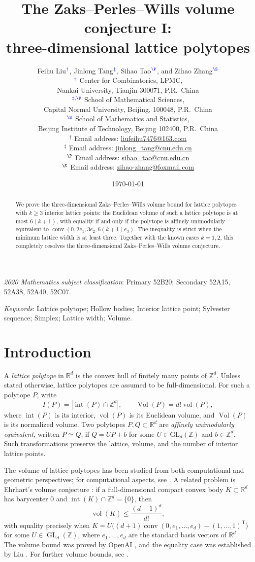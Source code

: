 \documentclass[reqno, 11pt]{article}
\title{The Zaks--Perles--Wills volume conjecture I:\\ three-dimensional lattice polytopes}
\author{Feihu Liu$^{\color{blue} \dag}$, Jinlong Tang$^{\color{blue} \ddag}$, Sihao Tao$^{\color{blue} \P}$, and Zihao Zhang$^{\color{blue} \S}$
\\[2mm]
{\small $^{\color{blue} \dag}$ Center for Combinatorics, LPMC,}\\[-0.8ex]
{\small Nankai University, Tianjin 300071, P.R.~China}\\
{\small $^{\color{blue} \ddag, \P}$ School of Mathematical Sciences,}\\[-0.8ex]
{\small Capital Normal University, Beijing, 100048, P.R.~China}\\
{\small $^{\color{blue} \S}$ School of Mathematics and Statistics,}\\[-0.8ex]
{\small Beijing Institute of Technology, Beijing 102400, P.R.~China}\\
{\small {\color{blue} $^\dag$} Email address: \url{liufeihu7476@163.com}}\\
{\small {\color{blue} $^\ddag$} Email address: \url{jinlong\_tang@cnu.edu.cn}}\\
{\small {\color{blue} $^\P$} Email address: \url{sihao\_tao@cnu.edu.cn}}\\
{\small {\color{blue} $^\S$} Email address: \url{zihao-zhang@foxmail.com}}\\
}
\date{\today}
\numberwithin{equation}{section}
\theoremstyle{definition}
\newcommand{\R}{\mathbb R}
\newcommand{\Z}{\mathbb Z}
\DeclareMathOperator{\Int}{int}
\DeclareMathOperator{\vol}{vol}
\DeclareMathOperator{\conv}{conv}
\numberwithin{equation}{section}
\begin{document}
\maketitle

\begin{abstract}
We prove the three-dimensional Zaks--Perles--Wills volume bound for lattice polytopes with $k\ge3$ interior lattice points: the Euclidean volume of such a lattice polytope is at most $6(k+1)$, with equality if and only if the polytope is affinely unimodularly equivalent to $\operatorname{conv}(0,2e_1,3e_2,6(k+1)e_3)$. The inequality is strict when the minimum lattice width is at least three. Together with the known cases $k=1,2$, this completely resolves the three-dimensional Zaks--Perles--Wills volume conjecture.
\end{abstract}

\noindent
\begin{small}
\emph{2020 Mathematics subject classification}: Primary 52B20; Secondary 52A15, 52A38, 52A40, 52C07.
\end{small}

\noindent
\begin{small}
\emph{Keywords}: Lattice polytope; Hollow bodies; Interior lattice point; Sylvester sequence; Simplex; Lattice width; Volume.
\end{small}


\section{Introduction}\label{sec:introduction}

A \emph{lattice polytope} in $\R^d$ is the convex hull of finitely many points of $\Z^d$.
Unless stated otherwise, lattice polytopes are assumed to be full-dimensional.
For such a polytope $P$, write
\[
I(P)=|\Int(P)\cap\Z^d|,\qquad
\operatorname{Vol}(P)=d!\vol(P),
\]
where $\Int(P)$ is its interior, $\vol(P)$ is its Euclidean volume, and
$\operatorname{Vol}(P)$ is its normalized volume.
Two polytopes $P,Q\subset\R^d$ are \emph{affinely unimodularly equivalent},
written $P\simeq Q$, if $Q=UP+b$ for some $U\in\mathrm{GL}_d(\Z)$
and $b\in\Z^d$. Such transformations preserve the lattice, volume,
and the number of interior lattice points.

The volume of lattice polytopes has been studied from both computational and geometric perspectives; for computational aspects, see
\cite{BBCVVolum,DeLoera}. A related problem is Ehrhart's volume conjecture
\cite{EhrhartVolume,BNillPaffenhonlz}: if a full-dimensional compact convex
body $K\subset\R^d$ has barycenter $0$ and
$\Int(K)\cap\Z^d=\{0\}$, then
\[
\vol(K)\le\frac{(d+1)^d}{d!},
\]
with equality precisely when  $
 K=U\bigl((d+1)\conv(0,e_1,\ldots,e_d)-(1,\ldots,1)^{\mathsf{T}}\bigr)$ for some $U\in\operatorname{GL}_d(\mathbb Z)$,
where $e_1,\ldots,e_d$ are the standard basis vectors of $\mathbb R^d$.
The volume bound was proved by OpenAI \cite[Chapter~8, Theorem~1.1]{OAI26},
and the equality case was established by Liu \cite[Theorem~1.3]{LiuJiHao}.
For further volume bounds, see \cite{Bau25,Nill07}.
\end{document}
